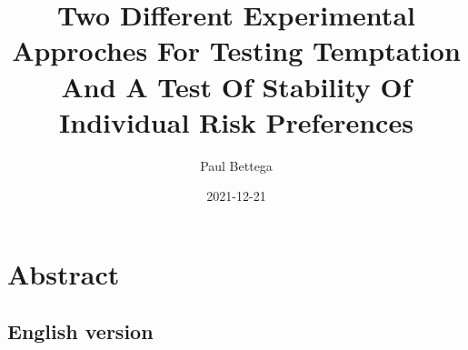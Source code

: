 \documentclass[
]{book}
\title{Two Different Experimental Approches For Testing Temptation And A Test Of Stability Of Individual Risk Preferences}
\author{Paul Bettega}
\date{2021-12-21}
\begin{document}
\maketitle

{
\setcounter{tocdepth}{1}
\tableofcontents
}
\hypertarget{abstract}{%
\chapter*{Abstract}\label{abstract}}

\hypertarget{english-version}{%
\section*{English version}\label{english-version}}
\end{document}

